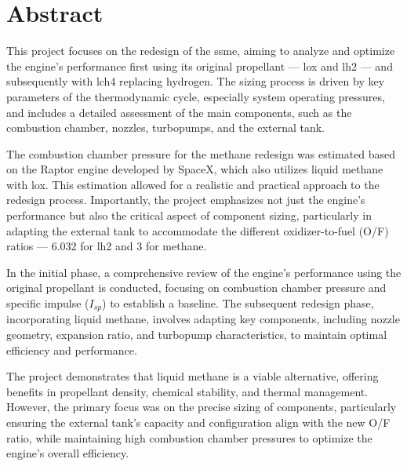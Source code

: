 

\maketitle
\newpage
    \section*{Abstract}
     This project focuses on the redesign of the \acrfull{ssme}, aiming to analyze and optimize the engine's performance first using its original propellant — \acrfull{lox} and \acrfull{lh2} — and subsequently with \acrfull{lch4} replacing hydrogen.
     The sizing process is driven by key parameters of the thermodynamic cycle, especially system operating pressures, and includes a detailed assessment of the main components, such as the combustion chamber, nozzles, turbopumps, and the external tank.

   The combustion chamber pressure for the methane redesign was estimated based on the Raptor engine developed by SpaceX, which also utilizes liquid methane with \acrlong{lox}.
   This estimation allowed for a realistic and practical approach to the redesign process.
   Importantly, the project emphasizes not just the engine's performance but also the critical aspect of component sizing, particularly in adapting the external tank to accommodate the different oxidizer-to-fuel (O/F) ratios — 6.032 for \acrshort{lh2} and 3 for methane.

   In the initial phase, a comprehensive review of the engine's performance using the original propellant is conducted, focusing on combustion chamber pressure and specific impulse ($I_{sp}$) to establish a baseline.
   The subsequent redesign phase, incorporating liquid methane, involves adapting key components, including nozzle geometry, expansion ratio, and turbopump characteristics, to maintain optimal efficiency and performance.

   The project demonstrates that liquid methane is a viable alternative, offering benefits in propellant density, chemical stability, and thermal management. However, the primary focus was on the precise sizing of components, particularly ensuring the external tank's capacity and configuration align with the new O/F ratio, while maintaining high combustion chamber pressures to optimize the engine's overall efficiency.
   \newpage
\tableofcontents
    \newpage
\printnomenclature 
    \newpage
    \printglossary[type=\acronymtype]
\newpage
\listoffigures
\listoftables

